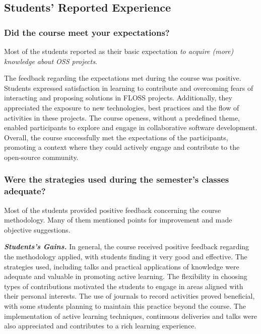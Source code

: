\documentclass[sigconf]{acmart}
\begin{document}

\subsection{Students' Reported Experience}

\subsubsection{Did the course meet your expectations?}
%

Most of the students reported as their basic expectation \textit{to acquire (more) knowledge about OSS projects}.
%

The feedback regarding the expectations met during the course was positive. Students expressed satisfaction in learning to contribute and overcoming fears of interacting and proposing solutions in FLOSS projects. Additionally, they appreciated the exposure to new technologies, best practices and the flow of activities in these projects. The course openess, without a predefined theme, enabled participants to explore and engage in collaborative software development. Overall, the course successfully met the expectations of the participants, promoting a context where they could actively engage and contribute to the open-source community.


\subsubsection{Were the strategies used during the semester's classes adequate?}

Most of the students provided positive feedback concerning the course methodology. Many of them mentioned points for improvement and made objective suggestions.


\textit{\textbf{Students's Gains.}}
In general, the course received positive feedback regarding the methodology applied, with students finding it very good and effective. The strategies used, including talks and practical applications of knowledge were adequate and valuable in promoting active learning. The flexibility in choosing types of contributions motivated the students to engage in areas aligned with their personal interests. The use of journals to record activities proved beneficial, with some students planning to maintain this practice beyond the course. The implementation of active learning techniques, continuous deliveries and talks were also appreciated and contributes to a rich learning experience.
\end{document}
